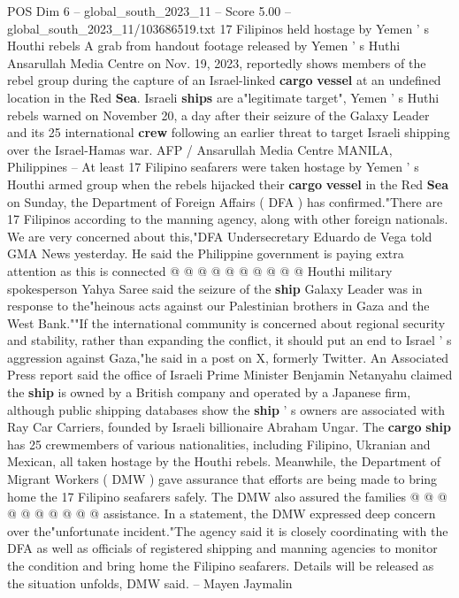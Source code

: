\begin{textsample}{POS Dim 6 – global\_south\_2023\_11 – Score 5.00 – global\_south\_2023\_11/103686519.txt}  \label{ex:f6_pos_310}
17 Filipinos held hostage by Yemen ' s Houthi rebels A grab from handout footage released by Yemen ' s Huthi Ansarullah Media Centre on Nov. 19, 2023, reportedly shows members of the rebel group during the capture of an Israel-linked \textbf{cargo} \textbf{vessel} at an undefined location in the Red \textbf{Sea}.
Israeli \textbf{ships} are a"legitimate target", Yemen ' s Huthi rebels warned on November 20, a day after their seizure of the Galaxy Leader and its 25 international \textbf{crew} following an earlier threat to target Israeli shipping over the Israel-Hamas war.
AFP / Ansarullah Media Centre MANILA, Philippines -- At least 17 Filipino seafarers were taken hostage by Yemen ' s Houthi armed group when the rebels hijacked their \textbf{cargo} \textbf{vessel} in the Red \textbf{Sea} on Sunday, the Department of Foreign Affairs ( DFA ) has confirmed."There are 17 Filipinos according to the manning agency, along with other foreign nationals.
We are very concerned about this,"DFA Undersecretary Eduardo de Vega told GMA News yesterday.
He said the Philippine government is paying extra attention as this is connected @ @ @ @ @ @ @ @ @ @ Houthi military spokesperson Yahya Saree said the seizure of the \textbf{ship} Galaxy Leader was in response to the"heinous acts against our Palestinian brothers in Gaza and the West Bank.""If the international community is concerned about regional security and stability, rather than expanding the conflict, it should put an end to Israel ' s aggression against Gaza,"he said in a post on X, formerly Twitter.
An Associated Press report said the office of Israeli Prime Minister Benjamin Netanyahu claimed the \textbf{ship} is owned by a British company and operated by a Japanese firm, although public shipping databases show the \textbf{ship} ' s owners are associated with Ray Car Carriers, founded by Israeli billionaire Abraham Ungar.
The \textbf{cargo} \textbf{ship} has 25 crewmembers of various nationalities, including Filipino, Ukranian and Mexican, all taken hostage by the Houthi rebels.
Meanwhile, the Department of Migrant Workers ( DMW ) gave assurance that efforts are being made to bring home the 17 Filipino seafarers safely.
The DMW also assured the families @ @ @ @ @ @ @ @ @ @ assistance.
In a statement, the DMW expressed deep concern over the"unfortunate incident."The agency said it is closely coordinating with the DFA as well as officials of registered shipping and manning agencies to monitor the condition and bring home the Filipino seafarers.
Details will be released as the situation unfolds, DMW said. -- Mayen Jaymalin

\end{textsample}
